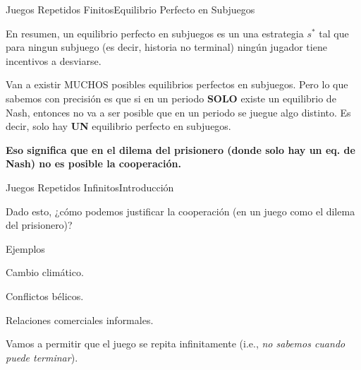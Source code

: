 \documentclass[notes, 11pt]{beamer} %
\newenvironment{wideitemize}{\itemize\addtolength{\itemsep}{10pt}}{\enditemize}
\begin{document}
\begin{frame}{Juegos Repetidos Finitos}{Equilibrio Perfecto en Subjuegos}
	\begin{wideitemize}
		\item<1-> En resumen, un equilibrio perfecto en subjuegos es un una estrategia $s^{*}$ tal que para ningun subjuego (es decir, historia no terminal) ning\'un jugador tiene incentivos a desviarse.
		\item<2-> Van a existir MUCHOS posibles equilibrios perfectos en subjuegos. Pero lo que sabemos con precisi\'on es que si en un periodo \textbf{SOLO} existe un equilibrio de Nash, entonces no va a ser posible que en un periodo se juegue algo distinto. Es decir, solo hay \textbf{UN} equilibrio perfecto en subjuegos.
		\item<3-> \textbf{Eso significa que en el dilema del prisionero (donde solo hay un eq. de Nash) no es posible la cooperaci\'on.}
	\end{wideitemize}
\end{frame}


\begin{frame}{Juegos Repetidos Infinitos}{Introducci\'on}
	\begin{wideitemize}
		\item<1-> Dado esto, ¿c\'omo podemos justificar la cooperaci\'on (en un juego como el dilema del prisionero)?
		\item<2-> Ejemplos
		\begin{wideitemize}
			\item<3->[--] Cambio clim\'atico.
			\item<4->[--] Conflictos b\'elicos.
			\item<5->[--] Relaciones comerciales informales.
		\end{wideitemize}
		\item<6-> Vamos a permitir que el juego se repita infinitamente (i.e., \textit{no sabemos cuando puede terminar}).
	\end{wideitemize}
\end{frame}
\end{document}
